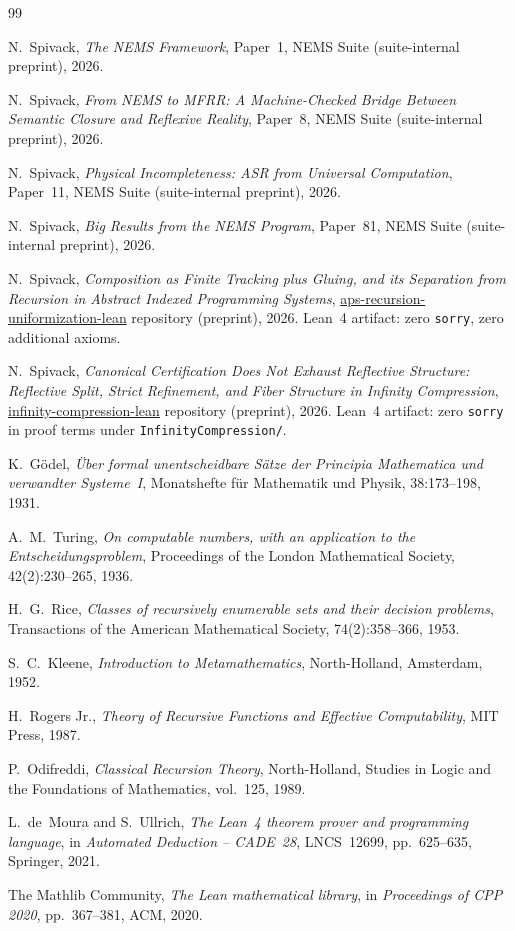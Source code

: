 \documentclass[11pt]{article}
\begin{document}
\begin{thebibliography}{99}
\raggedright

  N.~Spivack, \emph{The NEMS Framework},
  Paper~1, NEMS Suite (suite-internal preprint), 2026.

  N.~Spivack, \emph{From NEMS to MFRR: A Machine-Checked Bridge Between Semantic
  Closure and Reflexive Reality},
  Paper~8, NEMS Suite (suite-internal preprint), 2026.

  N.~Spivack, \emph{Physical Incompleteness: ASR from Universal Computation},
  Paper~11, NEMS Suite (suite-internal preprint), 2026.

  N.~Spivack, \emph{Big Results from the NEMS Program},
  Paper~81, NEMS Suite (suite-internal preprint), 2026.

  N.~Spivack, \emph{Composition as Finite Tracking plus Gluing,
  and its Separation from Recursion in Abstract Indexed Programming Systems},
  \url{aps-recursion-uniformization-lean} repository (preprint), 2026.
  Lean~4 artifact: zero \texttt{sorry}, zero additional axioms.

  N.~Spivack, \emph{Canonical Certification Does Not Exhaust Reflective Structure:
  Reflective Split, Strict Refinement, and Fiber Structure in Infinity Compression},
  \url{infinity-compression-lean} repository (preprint), 2026.
  Lean~4 artifact: zero \texttt{sorry} in proof terms under \texttt{InfinityCompression/}.

  K.~Gödel,
  \emph{Über formal unentscheidbare Sätze der Principia Mathematica und
  verwandter Systeme~I},
  Monatshefte für Mathematik und Physik, 38:173--198, 1931.

  A.~M.~Turing,
  \emph{On computable numbers, with an application to the Entscheidungsproblem},
  Proceedings of the London Mathematical Society, 42(2):230--265, 1936.

  H.~G.~Rice,
  \emph{Classes of recursively enumerable sets and their decision problems},
  Transactions of the American Mathematical Society, 74(2):358--366, 1953.

  S.~C.~Kleene,
  \emph{Introduction to Metamathematics},
  North-Holland, Amsterdam, 1952.

  H.~Rogers Jr., \emph{Theory of Recursive Functions and Effective Computability},
  MIT Press, 1987.

  P.~Odifreddi, \emph{Classical Recursion Theory},
  North-Holland, Studies in Logic and the Foundations of Mathematics,
  vol.~125, 1989.

  L.~de~Moura and S.~Ullrich,
  \emph{The Lean~4 theorem prover and programming language},
  in \emph{Automated Deduction -- CADE~28}, LNCS~12699,
  pp.~625--635, Springer, 2021.

  The Mathlib Community,
  \emph{The Lean mathematical library},
  in \emph{Proceedings of CPP 2020}, pp.~367--381, ACM, 2020.

\end{thebibliography}
\end{document}
